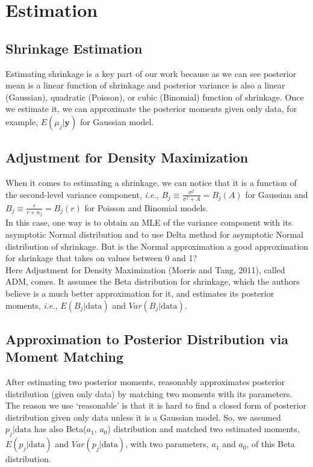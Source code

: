 \documentclass[article]{jss}
\begin{document}
\section[Estimation]{Estimation}
\subsection[Shrinkage Estimation]{Shrinkage Estimation}
Estimating shrinkage is a key part of our work because as we can see posterior mean is a linear function of shrinkage and posterior variance is also a linear (Gaussian), quadratic (Poisson), or cubic (Binomial) function of shrinkage. Once we estimate it, we can approximate the posterior moments given only data, for example, $E(\mu_{j}\vert \textbf{y})$ for Gaussian model.
\subsection[ADM]{Adjustment for Density Maximization}
When it comes to estimating a shrinkage, we can notice that it is a function of the second-level variance component, \emph{i.e.}, $B_{j}\equiv\frac{\sigma^{2}}{\sigma^{2}+A}=B_{j}(A)$ for Gaussian and $B_{j}\equiv\frac{r}{r+n_{j}}=B_{j}(r)$ for Poisson and Binomial models.
\\

In this case, one way is to obtain an MLE of the variance component with its asymptotic Normal distribution and to use Delta method for asymptotic Normal distribution of shrinkage. But is the Normal approximation a good approximation for shrinkage that takes on values between 0 and 1?
\\

Here Adjustment for Density Maximization (Morris and Tang, 2011), called ADM, comes. It assumes the Beta distribution for shrinkage, which the authors believe is a much better approximation for it, and estimates its posterior moments, \emph{i.e.}, $E(B_{j}\vert\textrm{data})$ and $Var(B_{j}\vert\textrm{data})$.

\subsection[Approximation to Posterior Distribution by Moment Matching]{Approximation to Posterior Distribution via Moment Matching}
After estimating two posterior moments,  reasonably approximates posterior distribution (given only data) by matching two moments with its parameters. The reason we use `reasonable' is that it is hard to find a closed form of posterior distribution given only data unless it is a Gaussian model. So, we assumed $p_{j}\vert \textrm{data}$ has also Beta($a_{1}$, $a_{0}$) distribution and matched two estimated moments, $E(p_{j}\vert \textrm{data})$ and $Var(p_{j}\vert \textrm{data})$, with two parameters, $a_{1}$ and $a_{0}$, of this Beta distribution. 
\end{document}
